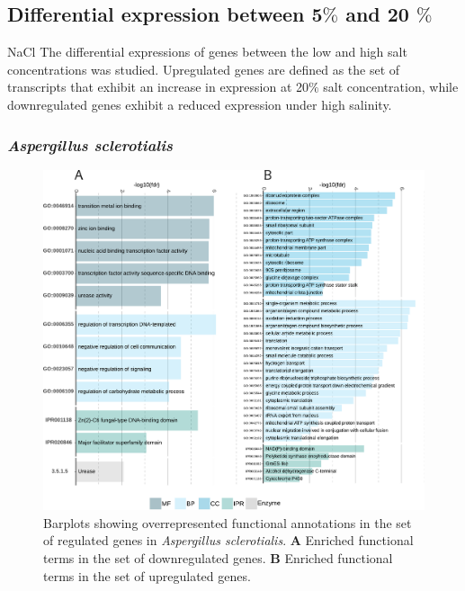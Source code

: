 \documentclass[jof,article,submit,moreauthors,pdftex,10pt,a4paper]{Definitions/mdpi}
\newcommand{\phiScl}{\textit{Aspergillus sclerotialis}}
\begin{document}
\subsection{Differential expression between 5$\%$ and 20 $\%$} NaCl
The differential expressions of genes between the low and high salt concentrations was studied. Upregulated genes are defined as the set of transcripts that exhibit an increase in expression at 20$\%$ salt concentration, while downregulated genes exhibit a reduced expression under high salinity.  

\subsubsection{\phiScl}

\begin{figure}[htpb]
    \centering
    \includegraphics[width=\linewidth]{phiScl_SALT_summary.pdf}
    \caption{\label{fig:phiSclUpDown} Barplots showing overrepresented functional annotations in the set of regulated genes in {\phiScl}. \textbf{A} Enriched functional terms in the set of downregulated genes. \textbf{B} Enriched functional terms in the set of upregulated genes.}
\end{figure}
\end{document}

